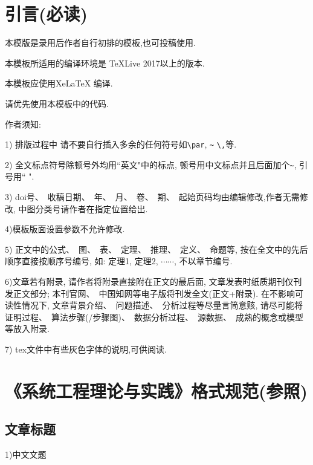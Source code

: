\documentclass{setp-new}
\begin{document}



\maketitle
\section{引言(必读)}

本模版是录用后作者自行初排的模板,也可投稿使用.

本模板所适用的编译环境是 TeXLive 2017以上的版本.

本模板应使用XeLaTeX 编译.

请优先使用本模板中的代码.



作者须知:


1) 排版过程中 请不要自行插入多余的任何符号如\verb|\par|, \verb|~| \verb|\,|等.


2) 全文标点符号除顿号外均用``英文"中的标点, 顿号用中文标点并且后面加个\verb|~|, 引号用`` ".

3) doi号、~收稿日期、~年、~月、~卷、~期、~起始页码均由编辑修改,作者无需修改,
中图分类号请作者在指定位置给出.

4)模板版面设置参数不允许修改.

5) 正文中的公式、~图、~表、~定理、~推理、~定义、~命题等, 按在全文中的先后顺序直接按顺序号编号, 如:  定理1, 定理2, $\cdots$$\cdots$, 不以章节编号.

6)文章若有附录, 请作者将附录直接附在正文的最后面, 文章发表时纸质期刊仅刊发正文部分; 本刊官网、~中国知网等电子版将刊发全文(正文+附录). 在不影响可读性情况下, 文章背景介绍、~问题描述、~分析过程等尽量言简意赅, 请尽可能将证明过程、~算法步骤(/步骤图)、~数据分析过程、~源数据、~成熟的概念或模型等放入附录.

7) tex文件中有些灰色字体的说明,可供阅读.

\section{《系统工程理论与实践》格式规范(参照)}


\subsection{文章标题}


1)中文文题　
\end{document}
